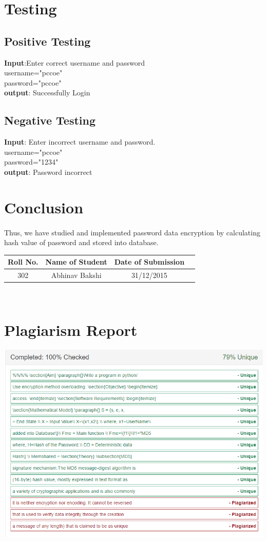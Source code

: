 \documentclass[a4paper,12pt]{article}
\begin{document}
\section{Testing}
\subsection{Positive Testing}

\textbf{Input}:Enter correct username and password\\
username="pccoe"\\
password="pccoe"\\
\textbf{output}: Successfully Login\\
\subsection{Negative Testing}
\textbf{Input}: Enter incorrect username and password.
\\
username="pccoe"\\
password="1234"\\
\textbf{output}: Password incorrect
\section{Conclusion}
	\paragraph{} Thus, we have studied and implemented password data encryption by calculating hash value of password and stored into database.
\vspace{20px}
\begin{center}
	\begin{tabular}
		{|c|c|c|c|}\hline
		{\bf Roll No.}		&{\bf Name of Student}		&{\bf Date of Submission}  \\ \hline
		{302}	&	{Abhinav Bakshi}	&  {31/12/2015} \\ \hline
	\end{tabular}\\ 
\end{center}

\section{Plagiarism Report}
    \includegraphics[width=\textwidth]{encr_plag}
\end{document}
